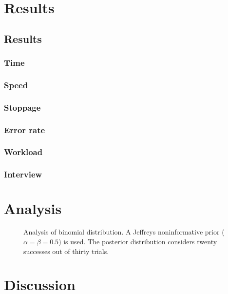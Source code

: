 \chapter{Results}
\label{ch:results}
\section{Results}
  \subsection{Time}
  \subsection{Speed}
  \subsection{Stoppage}
  \subsection{Error rate}
  \subsection{Workload}
  \subsection{Interview}
\chapter{Analysis}
\begin{figure}[h]
  \centering
  
  \caption[Overall result curve]{Analysis of binomial distribution. A Jeffreys noninformative prior ($\alpha = \beta = 0.5$) is used. The posterior distribution considers twenty successes out of thirty trials.}
  \label{fig:binom}
\end{figure}
\chapter{Discussion}
